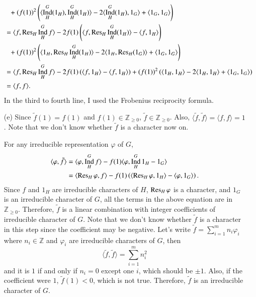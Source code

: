 \documentclass[a4paper, 12pt]{article}
\theoremstyle{Mydefinition}
\theoremstyle{Mytheorem}
\DeclareMathOperator{\Ind}{Ind}
\begin{document}
\begin{enumerate}
\begin{equation}
\begin{split}
        &\phantom{=}+\left(f(1)\right)^2\left(\langle \Ind_H^G(1_H), \Ind_H^G(1_H)\rangle-2\langle \Ind_H^G(1_H), 1_G\rangle +\langle 1_G, 1_G\rangle\right)\\
        &=\langle f, \Res_H\Ind_H^G f \rangle - 2f(1)\left(\langle f, \Res_H\Ind_H^G(1_H)\rangle-\langle f, 1_H\rangle\right)\\
        &\phantom{=}+\left(f(1)\right)^2\left(\langle 1_H, \Res_H\Ind_H^G(1_H)\rangle -2\langle 1_H, \Res_H(1_G)\rangle + \langle 1_G, 1_G\rangle\right)\\
        &=\langle f, \Res_H\Ind_H^G f \rangle - 2f(1)\left(\langle f, 1_H\rangle-\langle f, 1_H\rangle\right)+\left(f(1)\right)^2\left(\langle 1_H, 1_H\rangle -2\langle 1_H, 1_H\rangle + \langle 1_G, 1_G\rangle\right)\\
        &=\langle f, f\rangle.
    \end{split}
    \end{equation}
    In the third to fourth line, I used the Frobenius reciprocity formula.
    \item[(e)] Since $\tilde{f}(1)=f(1)$ and $f(1)\in\mathbb{Z}_{\geq 0}$, $\tilde{f}\in \mathbb{Z}_{\geq 0}$. Also, $\langle \tilde{f}, \tilde{f}\rangle = \langle f, f\rangle = 1$. Note that we don't know whether $\tilde{f}$ is a character now on. 
    
    For any irreducible representation $\varphi$ of $G$,
    \begin{equation}
    \begin{split}
        \langle \varphi, \tilde{f}\rangle &= \langle \varphi, \Ind_H^G f\rangle  - f(1)\langle \varphi, \Ind_H^G 1_H - 1_G\rangle \\
        &=\langle \Res_H\varphi,  f\rangle  - f(1)\left(\langle \Res_H\varphi, 1_H\rangle - \langle \varphi, 1_G\rangle\right).
    \end{split}
    \end{equation}
    Since $f$ and $1_H$ are irreducible characters of $H$, $\Res_H \varphi$ is a character, and $1_G$ is an irreducible character of $G$, all the terms in the above equation are in $\mathbb{Z}_{\geq 0}$. Therefore, $\tilde{f}$ is a linear combination with integer coefficients of irreducible character of $G$. Note that we don't know whether $\tilde{f}$ is a character in this step since the coefficient may be negative. Let's write $\tilde{f} = \sum_{i=1}^m n_i \varphi_i$ where $n_i\in\mathbb{Z}$ and $\varphi_i$ are irreducible characters of $G$, then
    \begin{equation}
        \langle \tilde{f}, \tilde{f}\rangle = \sum_{i=1}^m n_i^2
    \end{equation}
    and it is $1$ if and only if $n_i=0$ except one $i$, which should be $\pm 1$. Also, if the coefficient were $1$, $\tilde{f}(1)<0$, which is not true. Therefore, $\tilde{f}$ is an irreducible character of $G$.
    

\end{enumerate}
\end{document}
